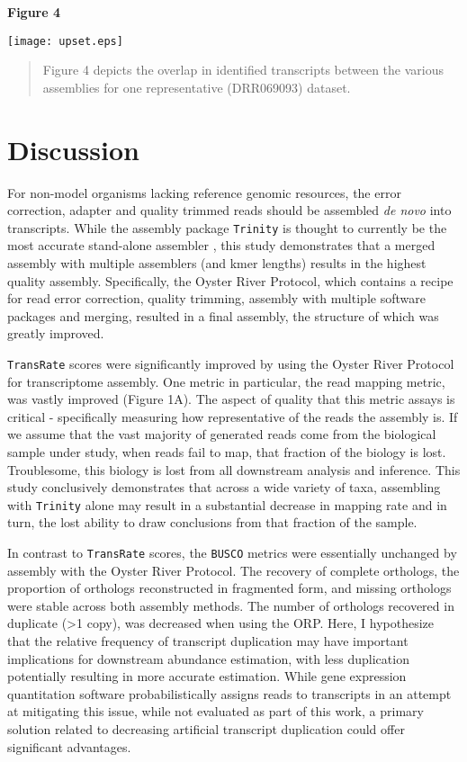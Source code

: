 \documentclass[10pt,letterpaper]{article}
\begin{document}
\textbf{\hypertarget{Figure 4}{Figure 4}} \\
\centerline{\texttt{[image: upset.eps]}}
\begin{quote}
\small{Figure 4 depicts the overlap in identified transcripts between the various assemblies for one representative (DRR069093) dataset.}
\end{quote}



\section{Discussion}

For non-model organisms lacking reference genomic resources, the error correction, adapter and quality trimmed reads should be assembled \textit{de novo} into transcripts. While the assembly package \texttt{Trinity} \citep{Haas:2013jq} is thought to currently be the most accurate stand-alone assembler \citep{Li:2014cm}, this study demonstrates that a merged assembly with multiple assemblers (and kmer lengths) results in the highest quality assembly. Specifically, the Oyster River Protocol, which contains a recipe for read error correction, quality trimming, assembly with multiple software packages and merging, resulted in a final assembly, the structure of which was greatly improved. 

\texttt{TransRate} scores were significantly improved by using the Oyster River Protocol for transcriptome assembly. One metric in particular, the read mapping metric, was vastly improved (Figure 1A). The aspect of quality that this metric assays is critical - specifically measuring how representative of the reads the assembly is. If we assume that the vast majority of generated reads come from the biological sample under study, when reads fail to map, that fraction of the biology is lost. Troublesome, this biology is lost from all downstream analysis and inference. This study conclusively demonstrates that across a wide variety of taxa, assembling with \texttt{Trinity} alone may result in a substantial decrease in mapping rate and in turn, the lost ability to draw conclusions from that fraction of the sample. 

In contrast to \texttt{TransRate} scores, the \texttt{BUSCO} metrics were essentially unchanged by assembly with the Oyster River Protocol. The recovery of complete orthologs, the proportion of orthologs reconstructed in fragmented form, and missing orthologs were stable across both assembly methods. The number of orthologs recovered in duplicate (\textgreater 1 copy), was decreased when using the ORP. Here, I hypothesize that the relative frequency of transcript duplication may have important implications for downstream abundance estimation, with less  duplication potentially resulting in more accurate estimation. While gene expression quantitation software \citep{Patro:2017iv,Bray:2016ee} probabilistically assigns reads to transcripts in an attempt at mitigating this issue, while not evaluated as part of this work, a primary solution related to decreasing artificial transcript duplication could offer significant advantages.
\end{document}
